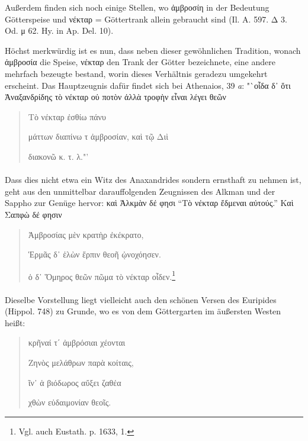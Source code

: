 \documentclass[a4paper, 11pt, oneside]{article}
\begin{document}
Außerdem finden sich noch einige Stellen, wo ἀμβροσίη in der Bedeutung Götterspeise und νέκταρ = Göttertrank allein gebraucht sind (Il. Α. 597. Δ 3. Od. μ 62. Hy. in Ap. Del. 10).

Höchst merkwürdig ist es nun, dass neben dieser gewöhnlichen Tradition, wonach ἀμβροσία die Speise, νέκταρ den Trank der Götter bezeichnete, eine andere mehrfach bezeugte bestand, worin dieses Verhältnis geradezu umgekehrt erscheint. Das Hauptzeugnis dafür findet sich bei Athenaios, 39 \emph{a}: "`οἶδα δ᾽ ὅτι Ἀναξανδρίδης τὸ νέκταρ οὐ ποτὸν ἀλλὰ τροφὴν εἶναι λέγει θεῶν
\begin{quotation}\large
\hspace*{15mm}Τὸ νέκταρ ἐσθίω πάνυ

μάττων διαπίνω τ ἀμβροσίαν, καὶ τῷ Διὶ

διακονῶ κ. τ. λ."'
\end{quotation}
\paragraph{}
Dass dies nicht etwa ein Witz des Anaxandrides sondern ernsthaft zu nehmen ist, geht aus den unmittelbar darauffolgenden Zeugnissen des Alkman und der Sappho zur Genüge hervor: καὶ Ἀλκμὰν δέ φησι "`Τὸ νέκταρ ἔδμεναι αὐτούς."' Καὶ Σαπφὼ δέ φησιν
\begin{quotation}\large
Ἀμβροσίας μὲν κρατὴρ ἐκέκρατο,

Ἑρμᾶς δ᾽ ἑλὼν ἕρπιν θεοῆ ᾠνοχόησεν.

ὁ δ᾽ Ὅμηρος θεῶν πῶμα τὸ νέκταρ οἶδεν.\footnote{Vgl. auch Eustath. p. 1633, 1.}
\end{quotation}
\paragraph{}
Dieselbe Vorstellung liegt vielleicht auch den schönen Versen des Euripides (Hippol. 748) zu Grunde, wo es von dem Göttergarten im äußersten Westen heißt:
\begin{quotation}\large
κρῆναί τ΄ ἀμβρόσιαι χέονται

Ζηνὸς μελάθρων παρὰ κοίταις,

ῖν᾽ ἁ βιόδωρος αὔξει ζαθέα

χθὼν εὐδαιμονίαν θεοῖς.
\end{quotation}
\end{document}
